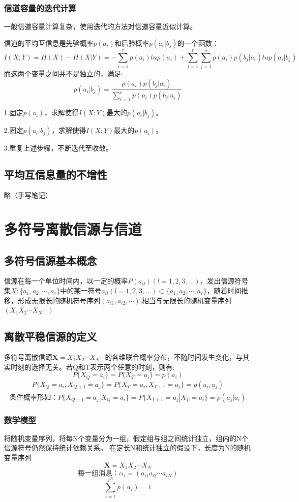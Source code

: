 \documentclass[UTF8]{ctexart} %
\begin{document}
		\subsubsection{信道容量的迭代计算}	
			一般信道容量计算复杂，使用迭代的方法对信道容量近似计算。
				
			信道的平均互信息是先验概率$p(a_i)$和后验概率$p(a_i|b_j)$的一个函数：
			\[I(X;Y) = H(X)-H(X|Y) = -\sum_{i=1}^rp(a_i)lnp(a_i)+\sum_{i=1}^r\sum_{j=1}^sp(a_i)p(b_j|a_i)lnp(a_i|b_j)\]
			而这两个变量之间并不是独立的，满足:
			\[p(a_i|b_j) = \frac{p(a_i)p(b_j|a_i)}{\sum_{i=1}^rp(a_i)p(b_j|a_i)}\]
			
			1.固定$p(a_i)$，求解使得$I(X;Y)$最大的$p(a_i|b_j)$。
			
			2.固定$p(a_i|b_j)$，求解使得$I(X;Y)$最大的$p(a_i)$。
			
			3.重复上述步骤，不断迭代至收敛。
	\subsection{平均互信息量的不增性}
		略（手写笔记）
		
	\section{多符号离散信源与信道}
		\subsection{多符号信源基本概念}
			信源在每一个单位时间内，以一定的概率$P(a_{il})(l=1,2,3,...)$，发出信源符号集$X:\{a_1,a_2,\cdots,a_r\}$中的某一符号$a_{il}(l=1,2,3,...)\subset\{a_1,a_2,\cdots,a_r\}$，随着时间推移，形成无限长的随机符号序列$(a_{i1},a_{i2},\cdots)$,相当与无限长的随机变量序列$(X_1X_2\cdots X_N\cdots)$
		\subsection{离散平稳信源的定义}
			多符号离散信源$\bm{X} = X_1X_2\cdots X_N\cdots$的各维联合概率分布，不随时间发生变化，与其实时刻的选择无关。若Q和T表示两个任意的时刻，则有:
			\[P\{X_Q=a_i\} = P\{X_T=a_i\} =p(a_i)\]
			\[P\{X_Q=a_i,X_{Q+1}=a_j\} = P\{X_T=a_i,X_{T+1}=a_j\} =p(a_i,a_j)\]
			\[\cdots\]
			\[\text{条件概率形如：}P\{X_{Q+1}=a_j|X_Q=a_i\} = P\{X_{T+1}=a_j|X_T=a_i\} =p(a_j|a_i)\]
			\subsubsection{数学模型}
				将随机变量序列，将每N个变量分为一组，假定组与组之间统计独立，组内的N个信源符号仍然保持统计依赖关系。 在定长N和统计独立的假设下，长度为N的随机变量序列
				\[\bm{X} = X_1X_2\cdots X_N\]
				\[\text{每一组消息：}\alpha_i = (a_{i1}a_{i2}\cdots a_{iN})\]
				\[\sum_{i=1}^{r^N}p(\alpha_i) = 1\]
\end{document}
